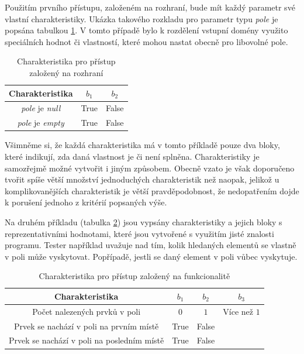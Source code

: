 Použitím prvního přístupu, založeném na rozhraní, bude mít každý parametr své vlastní charakteristiky. Ukázka takového rozkladu pro parametr typu \textit{pole} je popsána tabulkou \ref{table_charakteristika1}. V tomto případě bylo k rozdělení vstupní domény využito speciálních hodnot či vlastností, které mohou nastat obecně pro libovolné pole. 

\begin{table}[h!]
\centering
\begin{tabular}{ |c|c|c| } 
 \hline
 Charakteristika & $b_1$ & $b_2$ \\ 
 \hline
 \textit{pole} je \textit{null} & True & False \\ 
 \textit{pole} je \textit{empty} & True & False \\ 
 \hline
\end{tabular}
\caption{Charakteristika pro přístup založený na rozhraní\cite{3_IntroductionToSWTesting}}
\label{table_charakteristika1}
\end{table}

Všimněme si, že každá charakteristika má v tomto příkladě pouze dva bloky, které indikují, zda daná vlastnost je či není splněna. Charakteristiky je samozřejmě možné vytvořit i jiným způsobem. Obecně vzato je však doporučeno tvořit spíše větší množství jednoduchých charakteristik než naopak, jelikož u komplikovanějších charakteristik je větší pravděpodobnost, že nedopatřením dojde k porušení jednoho z kritérií popsaných výše.\cite{3_IntroductionToSWTesting} 

Na druhém příkladu (tabulka \ref{table_charakteristika2}) jsou vypsány charakteristiky a jejich bloky s reprezentativními hodnotami, které jsou vytvořené s využitím jisté znalosti programu. Tester například uvažuje nad tím, kolik hledaných elementů se vlastně v poli může vyskytovat. Popřípadě, jestli se daný element v poli vůbec vyskytuje. 


\begin{table}[h!]
\centering
\begin{tabular}{ |c|c|c|c| } 
 \hline
 Charakteristika & $b_1$ & $b_2$ & $b_3$ \\ 
 \hline
 Počet nalezených prvků v poli  & $0$ & $1$ & Více než $1$ \\ 
 Prvek se nachází v poli na prvním místě & True & False & \\
 Prvek se nachází v poli na posledním místě & True & False & \\ 
 \hline
\end{tabular}
\caption{Charakteristika pro přístup založený na funkcionalitě}
\label{table_charakteristika2}
\end{table}

